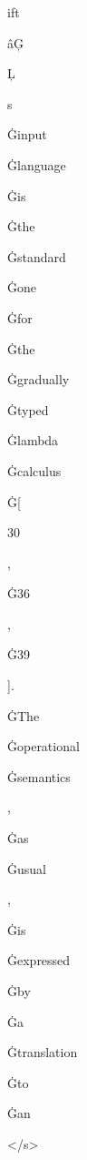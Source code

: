 \documentclass[varwidth]{standalone}
\begin{document}
\begin{CJK*}{UTF8}{gbsn}
{{{\colorbox{red!0.19066182}{\strut ift} \colorbox{red!0.3211799}{\strut âĢ} \colorbox{red!0.7228523}{\strut Ļ} \colorbox{red!0.41089487}{\strut s} \colorbox{red!0.46481505}{\strut Ġinput} \colorbox{red!0.59270805}{\strut Ġlanguage} \colorbox{red!0.25548738}{\strut Ġis} \colorbox{red!0.40167174}{\strut Ġthe} \colorbox{red!0.41274285}{\strut Ġstandard} \colorbox{red!0.22353281}{\strut Ġone} \colorbox{red!0.3648735}{\strut Ġfor} \colorbox{red!0.4595479}{\strut Ġthe} \colorbox{red!0.40100273}{\strut Ġgradually} \colorbox{red!0.62331206}{\strut Ġtyped} \colorbox{red!0.8790141}{\strut Ġlambda} \colorbox{red!0.6033709}{\strut Ġcalculus} \colorbox{red!0.82768565}{\strut Ġ[} \colorbox{red!0.21917465}{\strut 30} \colorbox{red!0.2352409}{\strut ,} \colorbox{red!0.11069244}{\strut Ġ36} \colorbox{red!0.2673222}{\strut ,} \colorbox{red!0.10852748}{\strut Ġ39} \colorbox{red!0.32029375}{\strut ].} \colorbox{red!0.48688963}{\strut ĠThe} \colorbox{red!0.4371625}{\strut Ġoperational} \colorbox{red!0.4986672}{\strut Ġsemantics} \colorbox{red!0.06833349}{\strut ,} \colorbox{red!0.14379862}{\strut Ġas} \colorbox{red!0.2037749}{\strut Ġusual} \colorbox{red!0.14911346}{\strut ,} \colorbox{red!0.27656704}{\strut Ġis} \colorbox{red!0.23684378}{\strut Ġexpressed} \colorbox{red!0.33243564}{\strut Ġby} \colorbox{red!0.3701833}{\strut Ġa} \colorbox{red!0.49858236}{\strut Ġtranslation} \colorbox{red!0.42013162}{\strut Ġto} \colorbox{red!0.38195342}{\strut Ġan} \colorbox{red!0.6168873}{\strut </s>} 
}}}
\end{CJK*}
\end{document}
